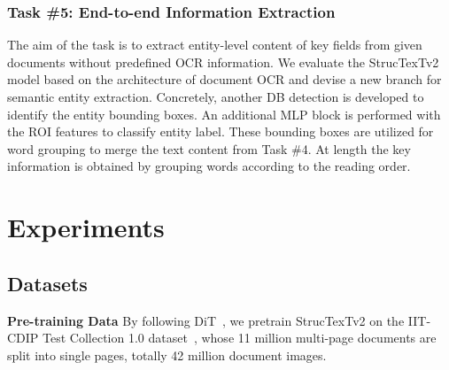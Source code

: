\documentclass{article} %
\begin{document}
\subsubsection{Task \#5: End-to-end Information Extraction}
The aim of the task is to extract entity-level content of key fields from given documents without predefined OCR information. We evaluate the StrucTexTv2 model based on the architecture of document OCR and devise a new branch for semantic entity extraction. Concretely, another DB detection is developed to identify the entity bounding boxes. An additional MLP block is performed with the ROI features to classify entity label. These bounding boxes are utilized for word grouping to merge the text content from Task \#4. At length the key information is obtained by grouping words according to the reading order.

\section{Experiments}

\subsection{Datasets} 
\noindent\textbf{Pre-training Data} By following DiT~\cite{li2022dit}, we pretrain StrucTexTv2 on the IIT-CDIP Test Collection 1.0 dataset~\cite{sigir06cdip}, whose 11 million multi-page documents are split into single pages, totally 42 million document images. 
\end{document}
